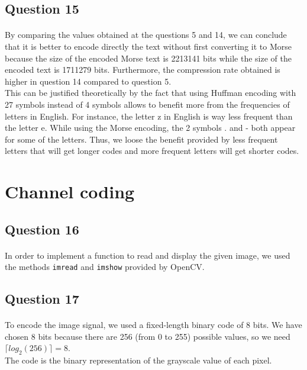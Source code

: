 \documentclass[a4paper, 11pt, oneside]{article}
\begin{document}

\subsection{Question 15}
\paragraph{}By comparing the values obtained at the questions 5 and 14, we can conclude that it is better to encode
directly the text without first converting it to Morse because the size of the encoded Morse text is 2213141 bits
while the size of the encoded text is 1711279 bits. Furthermore, the compression rate obtained is higher in question 14
compared to question 5.\\
This can be justified theoretically by the fact that using Huffman encoding with 27 symbols instead of 4 symbols allows to
benefit more from the frequencies of letters in English. For instance, the letter z in English is way less frequent
than the letter e. While using the Morse encoding, the 2 symbols . and - both appear for some of the letters. Thus, we
loose the benefit provided by less frequent letters that will get longer codes and more frequent letters will get shorter codes.

\section{Channel coding}

\subsection{Question 16}
\paragraph{}In order to implement a function to read and display the given image, we used the methods \texttt{imread} and \texttt{imshow} provided by OpenCV.


\subsection{Question 17}
\paragraph{}To encode the image signal, we used a fixed-length binary code of 8 bits. We have chosen 8 bits because there are 256 (from 0 to 255) possible values, so we need $\lceil log_2(256) \rceil =8$.\\
The code is the binary representation of the grayscale value of each pixel.
\end{document}
